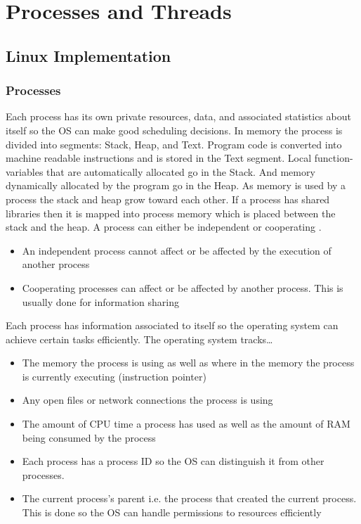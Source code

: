 \documentclass[onecolumn,draftclsnofoot, 10pt, compsoc]{IEEEtran}
\def \ParSpace{\vspace{.75em}}
\begin{document}

\section{Processes and Threads}
	\subsection{Linux Implementation}
		\subsubsection{Processes}
			Each process has its own private resources, data, and associated statistics about itself so the OS can make good scheduling decisions. 
			In memory the process is divided into segments: Stack, Heap, and Text. Program code is converted into machine readable instructions and is stored in the Text segment. 
			Local function-variables that are automatically allocated go in the Stack. 
			And memory dynamically allocated by the program go in the Heap. 
			As memory is used by a process the stack and heap grow toward each other. 
			If a process has shared libraries then it is mapped into process memory which is placed between the stack and the heap.
			A process can either be independent or cooperating \cite{processesLinux}.
			\begin{itemize}
				\item An independent process cannot affect or be affected by the execution of another process
				\item Cooperating processes can affect or be affected by another process. This is usually done for information sharing
			\end{itemize}
	
			\ParSpace
			Each process has information associated to itself so the operating system can achieve certain tasks efficiently.  The operating system tracks\dots
			\begin{itemize}
				\item The memory the process is using as well as where in the memory the process is currently executing (instruction pointer)
				\item Any open files or network connections the process is using
				\item The amount of CPU time a process has used as well as the amount of RAM being consumed by the process
				\item Each process has a process ID so the OS can distinguish it from other processes. 
				\item The current process's parent i.e. the process that created the current process. This is done so the OS can handle permissions to resources efficiently
			\end{itemize}
\end{document}
